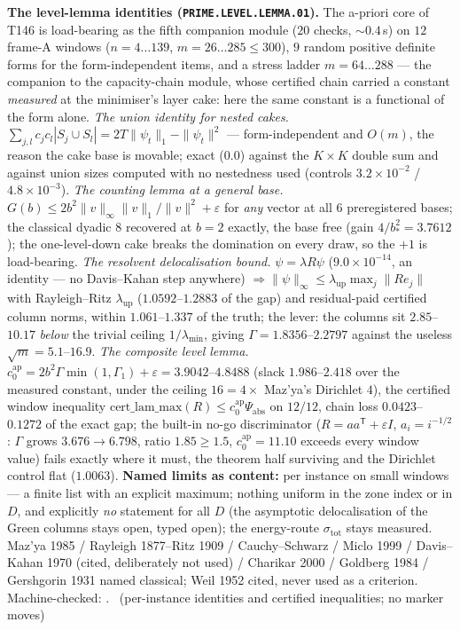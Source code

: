 \par\smallskip\noindent\textbf{The level-lemma identities
(\texttt{PRIME.LEVEL.LEMMA.01}).}
The a-priori core of T146 is load-bearing as the fifth companion module ($20$
checks, ${\sim}0.4$\,s) on $12$ frame-A windows ($n=4\ldots139$,
$m=26\ldots285\le300$), $9$ random positive definite forms for the
form-independent items, and a stress ladder $m=64\ldots288$ --- the companion
to the capacity-chain module, whose certified chain carried a constant
\emph{measured} at the minimiser's layer cake: here the same constant is a
functional of the form alone.
\emph{The union identity for nested cakes.}
$\sum_{j,l}c_jc_l|S_j\cup S_l|=2T\|\psi_t\|_1-\|\psi_t\|^2$ --- form-independent
and $O(m)$, the reason the cake base is movable; exact ($0.0$) against the
$K\times K$ double sum and against union sizes computed with no nestedness
used (controls $3.2\times10^{-2}$ / $4.8\times10^{-3}$).
\emph{The counting lemma at a general base.}
$G(b)\le2b^2\|v\|_\infty\|v\|_1/\|v\|^2+\varepsilon$ for \emph{any} vector at
all $6$ preregistered bases; the classical dyadic $8$ recovered at $b=2$
exactly, the base free (gain $4/b_*^2=3.7612$); the one-level-down cake breaks
the domination on every draw, so the $+1$ is load-bearing.
\emph{The resolvent delocalisation bound.} $\psi=\lambda R\psi$
($9.0\times10^{-14}$, an identity --- no Davis--Kahan step anywhere)
$\Rightarrow\|\psi\|_\infty\le\lambda_{\mathrm{up}}\max_j\|Re_j\|$ with
Rayleigh--Ritz $\lambda_{\mathrm{up}}$ ($1.0592$--$1.2883$ of the gap) and
residual-paid certified column norms, within $1.061$--$1.337$ of the truth;
the lever: the columns sit $2.85$--$10.17$ \emph{below} the trivial ceiling
$1/\lambda_{\min}$, giving $\Gamma=1.8356$--$2.2797$ against the useless
$\sqrt m=5.1$--$16.9$.
\emph{The composite level lemma.}
$c_0^{\mathrm{ap}}=2b^2\Gamma\min(1,\Gamma_1)+\varepsilon=3.9042$--$4.8488$
(slack $1.986$--$2.418$ over the measured constant, under the ceiling
$16=4\times$ Maz'ya's Dirichlet $4$), the certified window inequality
$\mathrm{cert\_lam\_max}(R)\le c_0^{\mathrm{ap}}\Psi_{\mathrm{abs}}$ on
$12/12$, chain loss $0.0423$--$0.1272$ of the exact gap; the built-in no-go
discriminator ($R=aa^{\mathsf T}+\varepsilon I$, $a_i=i^{-1/2}$: $\Gamma$
grows $3.676\to6.798$, ratio $1.85\ge1.5$, $c_0^{\mathrm{ap}}=11.10$ exceeds
every window value) fails exactly where it must, the theorem half surviving
and the Dirichlet control flat ($1.0063$).
\textbf{Named limits as content:} per instance on small windows --- a finite
list with an explicit maximum; nothing uniform in the zone index or in $D$,
and explicitly \emph{no} statement for all $D$ (the asymptotic delocalisation
of the Green columns stays open, typed open); the energy-route
$\sigma_{\mathrm{tot}}$ stays measured.
Maz'ya 1985 / Rayleigh 1877--Ritz 1909 / Cauchy--Schwarz / Miclo 1999 /
Davis--Kahan 1970 (cited, deliberately not used) / Charikar 2000 / Goldberg
1984 / Gershgorin 1931 named classical; Weil 1952 cited, never used as a
criterion.
Machine-checked:
.
\mE\ (per-instance identities and certified inequalities; no marker moves)


